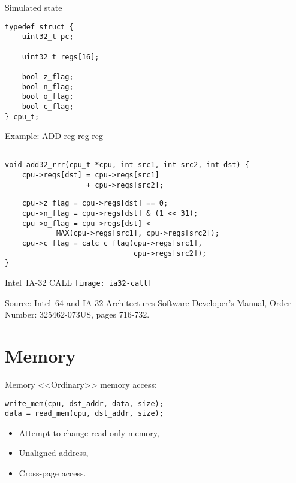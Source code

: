 \begin{frame}[fragile]{Simulated state}
\begin{lstlisting}
typedef struct {
    uint32_t pc;

    uint32_t regs[16];

    bool z_flag;
    bool n_flag;
    bool o_flag;
    bool c_flag;
} cpu_t;
\end{lstlisting}
\end{frame}

\begin{frame}[fragile]{Example: ADD reg reg reg}
\begin{lstlisting}

void add32_rrr(cpu_t *cpu, int src1, int src2, int dst) {
    cpu->regs[dst] = cpu->regs[src1]
                   + cpu->regs[src2];
\end{lstlisting}
\pause

\begin{lstlisting}
    cpu->z_flag = cpu->regs[dst] == 0;
    cpu->n_flag = cpu->regs[dst] & (1 << 31);
    cpu->o_flag = cpu->regs[dst] < 
            MAX(cpu->regs[src1], cpu->regs[src2]);
    cpu->c_flag = calc_c_flag(cpu->regs[src1],
                              cpu->regs[src2]);
}
\end{lstlisting}
\end{frame}

\begin{frame}{Intel\reg~IA-32 CALL}
\centering
\texttt{[image: ia32-call]}

\tiny{Source: Intel\reg~64 and IA-32 Architectures Software Developer’s Manual,
      Order Number: 325462-073US, pages 716-732.}
\end{frame}

\section{Memory}

\begin{frame}[fragile]{Memory}
<<Ordinary>> memory access:
\vfill
\begin{lstlisting}
write_mem(cpu, dst_addr, data, size);
data = read_mem(cpu, dst_addr, size);
\end{lstlisting}
\pause\vfill
\begin{itemize}
\item Attempt to change read-only memory,
\item Unaligned address,
\item Cross-page access.
\end{itemize}
\end{frame}

